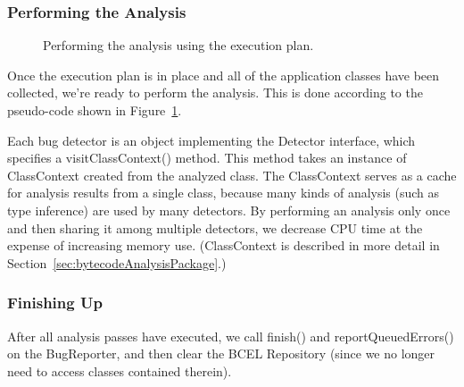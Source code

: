 \documentclass[11pt]{article}
\newcommand{\Indent}{\hskip .25in}
\newcommand{\ForEach}{{\bf for each}}
\newcommand{\Do}{{\bf do}}
\newcommand{\EndFor}{{\bf end for}}
\begin{document}
\subsubsection{Performing the Analysis}

\begin{figure}
\caption{Performing the analysis using the execution plan.}\label{fig:performingTheAnalysis}
\end{figure}

Once the execution plan is in place and all of the application classes have been collected,
we're ready to perform the analysis.  This is done according to the
pseudo-code shown in Figure~\ref{fig:performingTheAnalysis}.

Each bug detector is an object implementing the Detector interface,
which specifies a visitClassContext() method.  This method takes
an instance of ClassContext created from the analyzed class.  The ClassContext serves
as a cache for analysis results from a single class, because many
kinds of analysis (such as type inference) are used by many detectors.
By performing an analysis only once and then sharing it among multiple
detectors, we decrease CPU time at the expense of increasing memory use.
(ClassContext is described in more detail in Section~\ref{sec:bytecodeAnalysisPackage}.)

\subsubsection{Finishing Up}

After all analysis passes have executed, we call finish() and
reportQueuedErrors() on the BugReporter, and then clear the BCEL Repository
(since we no longer need to access classes contained therein).
\end{document}
